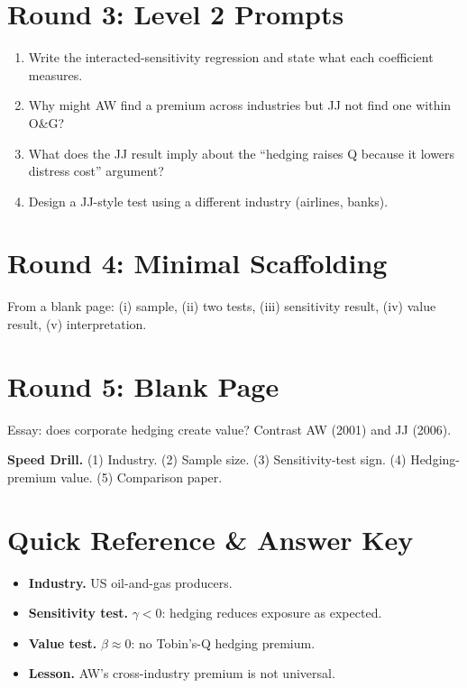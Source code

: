 \documentclass[11pt]{article}
\begin{document}
\section*{Round 3: Level 2 Prompts}
\begin{enumerate}
\item Write the interacted-sensitivity regression and state what each coefficient measures.
\item Why might AW find a premium across industries but JJ not find one within O\&G?
\item What does the JJ result imply about the ``hedging raises Q because it lowers distress cost'' argument?
\item Design a JJ-style test using a different industry (airlines, banks).
\end{enumerate}

\section*{Round 4: Minimal Scaffolding}
From a blank page: (i) sample, (ii) two tests, (iii) sensitivity result, (iv) value result, (v) interpretation.

\section*{Round 5: Blank Page}
Essay: does corporate hedging create value? Contrast AW (2001) and JJ (2006).

\vspace{6pt}
\begin{drillbox}
\textbf{Speed Drill.} (1) Industry. (2) Sample size. (3) Sensitivity-test sign. (4) Hedging-premium value. (5) Comparison paper.
\end{drillbox}

\section*{Quick Reference \& Answer Key}
\begin{answerbox}
\begin{itemize}
\item \textbf{Industry.} US oil-and-gas producers.
\item \textbf{Sensitivity test.} $\gamma<0$: hedging reduces exposure as expected.
\item \textbf{Value test.} $\beta\approx 0$: no Tobin's-Q hedging premium.
\item \textbf{Lesson.} AW's cross-industry premium is not universal.
\end{itemize}
\end{answerbox}
\end{document}
